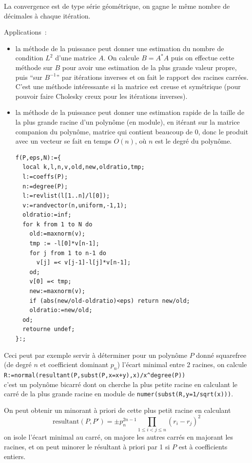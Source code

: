 \documentclass[a4paper,11pt]{article}
\begin{document}
\begin{giacjshere}
La convergence est de type série géométrique, on gagne le même nombre
de décimales à chaque itération. 

Applications~: 
\begin{itemize}
\item la m\'ethode de la puissance peut donner
une estimation du nombre de condition $L^2$ d'une
matrice $A$. On calcule $B=A^* A$ puis on effectue
cette m\'ethode sur $B$ pour avoir une estimation
de la plus grande valeur propre, puis ``sur $B^{-1}$''
par it\'erations inverses et on fait le rapport des racines carr\'ees.
C'est une m\'ethode int\'eressante si la matrice
est creuse et sym\'etrique (pour pouvoir faire Cholesky creux
pour les it\'erations inverses).
\item
la m\'ethode de la puissance peut donner une estimation
rapide de la taille de la plus grande racine d'un polyn\^ome (en
module), en it\'erant sur la matrice companion du polyn\^ome,
matrice qui contient beaucoup de 0, donc le produit avec un vecteur
se fait en temps $O(n)$, o\`u $n$ est le degr\'e du polyn\^ome.
\begin{verbatim}
f(P,eps,N):={
  local k,l,n,v,old,new,oldratio,tmp;
  l:=coeffs(P);
  n:=degree(P);
  l:=revlist(l[1..n]/l[0]);
  v:=randvector(n,uniform,-1,1);
  oldratio:=inf;
  for k from 1 to N do
    old:=maxnorm(v);
    tmp := -l[0]*v[n-1];
    for j from 1 to n-1 do
      v[j] =< v[j-1]-l[j]*v[n-1];
    od;
    v[0] =< tmp;
    new:=maxnorm(v);
    if (abs(new/old-oldratio)<eps) return new/old;
    oldratio:=new/old;
  od;
  retourne undef;
}:;
\end{verbatim}
\end{itemize}

Ceci peut par exemple servir à déterminer pour un polynôme $P$ donné
squarefree (de degr\'e $n$ et coefficient dominant $p_n$)
l'écart minimal entre 2 racines, on calcule\\
\verb|R:=normal(resultant(P,subst(P,x=x+y),x)/x^degree(P))|\\
c'est un polynôme bicarré dont on cherche la plus petite racine
en calculant le carré de la plus grande racine en module
de \verb|numer(subst(R,y=1/sqrt(x)))|.

On peut obtenir un minorant à priori de cette plus petit racine en calculant 
\[ 
\mbox{resultant}(P,P')= 
\pm p_n^{2n-1} \prod_{1 \leq i < j \leq n} (r_i-r_j)^2 
\]
on isole l'écart minimal au carré, on majore les autres carr\'es en
majorant les racines, et
on peut minorer le résultant à priori par 1 si $P$ est à coefficients
entiers.


\end{giacjshere}
\end{document}

